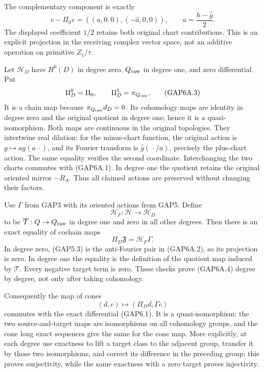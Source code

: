 The complementary component is exactly \[
v-\Pi_0v=((a,0,0),(-\widehat a,0,0)),\qquad
a=\frac{h-\widehat g}{2}.
\tag{GAP6A.2}
\] The displayed coefficient \(1/2\) retains both original chart
contributions. This is an explicit projection in the receiving complex
vector space, not an additive operation on primitive \(Z_1/\tau\).

Let \(\mathscr H_D\) have \(H^0(D)\) in degree zero, \(Q_{\rm raw}\) in
degree one, and zero differential. Put \[
\Pi_D^0=\Pi_0,\qquad \Pi_D^1=\pi_{Q_{\rm raw}}.
\tag{GAP6A.3}
\] It is a chain map because \(\pi_{Q_{\rm raw}}d_D=0\). Its cohomology
maps are identity in degree zero and the original quotient in degree
one; hence it is a quasi-isomorphism. Both maps are continuous in the
original topologies. They intertwine real dilation: for the minus-chart
function, the original action is \(g\mapsto a g(a\,\cdot)\), and its
Fourier transform is \(\widehat g(\,\cdot/a)\), precisely the plus-chart
action. The same equality verifies the second coordinate. Interchanging
the two charts commutes with (GAP6A.1). In degree one the quotient
retains the original oriented mirror \(-R_A\). Thus all claimed actions
are preserved without changing their factors.

Use \(\Gamma\) from GAP3 with its oriented actions from GAP5. Define \[
\mathscr H_F:\mathscr H\longrightarrow\mathscr H_D
\] to be \(\overline{\mathcal T}:Q\to Q_{\rm raw}\) in degree one and
zero in all other degrees. Then there is an exact equality of cochain
maps \[
\Pi_D\mathfrak F=\mathscr H_F\Gamma.
\tag{GAP6A.4}
\] In degree zero, (GAP5.3) is the anti-Fourier pair in (GAP6A.2), so
its projection is zero. In degree one the equality is the definition of
the quotient map induced by \(\mathcal T\). Every negative target term
is zero. These checks prove (GAP6A.4) degree by degree, not only after
taking cohomology.

Consequently the map of cones \[
(d,c)\longmapsto(\Pi_Dd,\Gamma c)
\tag{GAP6A.5}
\] commutes with the exact differential (GAP6.1). It is a
quasi-isomorphism: the two source-and-target maps are isomorphisms on
all cohomology groups, and the cone long exact sequences give the same
for the cone map. More explicitly, at each degree use exactness to lift
a target class to the adjacent group, transfer it by those two
isomorphisms, and correct its difference in the preceding group; this
proves surjectivity, while the same exactness with a zero target proves
injectivity.

